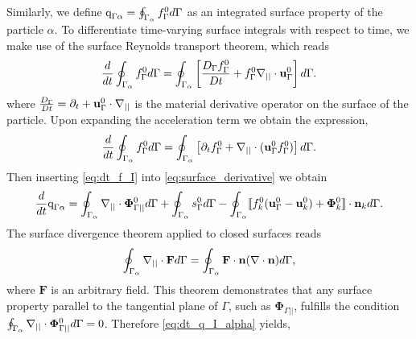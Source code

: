 Similarly, we define $\text q_{\Gamma\alpha} = \oint_{\Gamma_{\alpha}}  f_\Gamma^0 d\Gamma$ as an integrated surface property of the particle $\alpha$.
To differentiate time-varying surface integrals with respect to time, we make use of the surface Reynolds transport theorem, which reads \citep[Appendix B]{morel2015mathematical} %
\begin{equation}
    \ddt  \intS{f_\Gamma^0 }
    = \intS{ \left[
        \frac{D_\Gamma f_\Gamma^0}{Dt}
        +   f_\Gamma^0\gradI \cdot \textbf{u}_\Gamma^0
    \right]}.
    \label{eq:surface_derivative}
\end{equation}
where $\frac{D_\Gamma}{Dt}  = \partial_t + \textbf{u}_\Gamma^0\cdot \mathbf{\nabla}_{||} $ is the material derivative operator on the surface of the particle. 
Upon expanding the acceleration term we obtain the expression,
\begin{equation}
    \ddt  \intS{f_\Gamma^0 }
    = \intS{ \left[
        \pddt f_\Gamma^0
        +   \gradI \cdot (\textbf{u}_\Gamma^0f_\Gamma^0)
    \right]}.
    \label{eq:surface_derivative}
\end{equation}
Then inserting \ref{eq:dt_f_I} into \ref{eq:surface_derivative} we obtain
\begin{equation}
    \ddt  \text q_{\Gamma\alpha}
    = \intS{ 
        \gradI \cdot \boldsymbol{\Phi}_{\Gamma||}^0
    }
    +\intS{ 
        s_\Gamma^0
    }
    - \intS{
 \Jump{
        f_k^0 (\textbf{u}_\Gamma^0 - \textbf{u}_k^0)
        + \mathbf{\Phi}_k^0
    }
    }.
    \label{eq:dt_q_I_alpha}
\end{equation}
The surface divergence theorem applied to closed surfaces  reads \citep{nadim1996concise}
\begin{equation}
    \intS{\gradI \cdot \textbf{F}}
    = 
    \intS{ \textbf{F} \cdot  \textbf{n} (\div \textbf{n})},
    \label{eq:gauss_surface}
\end{equation} 
where $\textbf{F}$ is an arbitrary field.
This theorem demonstrates that any surface property parallel to the tangential plane of $\Gamma$, such as $\bm\Phi_{\Gamma||}$, fulfills the condition $\oint_{\Gamma_{\alpha}} \mathbf{\nabla}_{||}\cdot \bm\Phi_{\Gamma||}^0 d\Gamma
= 0$.
Therefore \ref{eq:dt_q_I_alpha} yields, %
